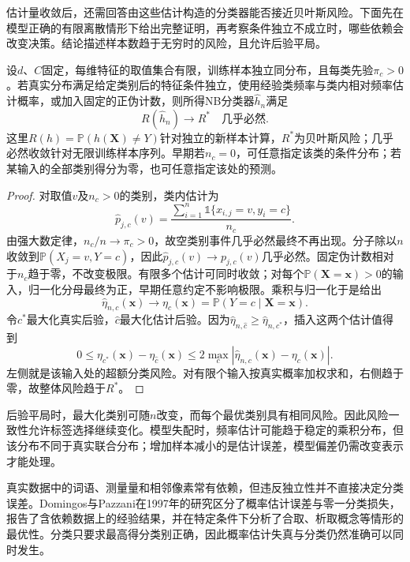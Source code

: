 估计量收敛后，还需回答由这些估计构造的分类器能否接近贝叶斯风险。下面先在模型正确的有限离散情形下给出完整证明，再考察条件独立不成立时，哪些依赖会改变决策。结论描述样本数趋于无穷时的风险，且允许后验平局。
\begin{theorem}[有限离散特征下NB的风险一致性]
  \label{thm:classification-naive-bayes-consistency}
  设$d$、$C$固定，每维特征的取值集合有限，训练样本独立同分布，且每类先验$\pi_c>0$。若真实分布满足给定类别后的特征条件独立，使用经验类频率与类内相对频率估计概率，或加入固定的正伪计数，则所得NB分类器$\hat h_n$满足
  \[
    R(\hat h_n)\longrightarrow R^\ast
    \quad\text{几乎必然}.
  \]
  这里$R(h)=\mathbb{P}(h(\bm{X})\neq Y)$针对独立的新样本计算，$R^\ast$为贝叶斯风险；几乎必然收敛针对无限训练样本序列。早期若$n_c=0$，可任意指定该类的条件分布；若某输入的全部类别得分为零，也可任意指定该处的预测。
\end{theorem}
\begin{proof}
  对取值$v$及$n_c>0$的类别，类内估计为
  \[
    \hat p_{j,c}(v)
    =\frac{\sum_{i=1}^{n}\mathbb{1}\{x_{i,j}=v,y_i=c\}}
           {n_c}.
  \]
  由强大数定律，$n_c/n\to\pi_c>0$，故空类别事件几乎必然最终不再出现。分子除以$n$收敛到$\mathbb{P}(X_j=v,Y=c)$，因此$\hat p_{j,c}(v)\to p_{j,c}(v)$几乎必然。固定伪计数相对于$n_c$趋于零，不改变极限。有限多个估计可同时收敛；对每个$\mathbb{P}(\bm{X}=\bm{x})>0$的输入，归一化分母最终为正，早期任意约定不影响极限。乘积与归一化于是给出
  \[
    \hat\eta_{n,c}(\bm{x})
    \longrightarrow
    \eta_c(\bm{x})=\mathbb{P}(Y=c\mid\bm{X}=\bm{x}).
  \]
  令$c^\ast$最大化真实后验，$\hat c$最大化估计后验。因为$\hat\eta_{n,\hat c}\geq\hat\eta_{n,c^\ast}$，插入这两个估计值得到
  \[
    0\leq\eta_{c^\ast}(\bm{x})-\eta_{\hat c}(\bm{x})
    \leq2\max_c|\hat\eta_{n,c}(\bm{x})-\eta_c(\bm{x})|.
  \]
  左侧就是该输入处的超额分类风险。对有限个输入按真实概率加权求和，右侧趋于零，故整体风险趋于$R^\ast$。
\end{proof}

后验平局时，最大化类别可随$n$改变，而每个最优类别具有相同风险。因此风险一致性允许标签选择继续变化。模型失配时，频率估计可能趋于稳定的乘积分布，但该分布不同于真实联合分布；增加样本减小的是估计误差，模型偏差仍需改变表示才能处理。

真实数据中的词语、测量量和相邻像素常有依赖，但违反独立性并不直接决定分类误差。Domingos与Pazzani在1997年的研究区分了概率估计误差与零一分类损失，报告了含依赖数据上的经验结果，并在特定条件下分析了合取、析取概念等情形的最优性。分类只要求最高得分类别正确，因此概率估计失真与分类仍然准确可以同时发生。

